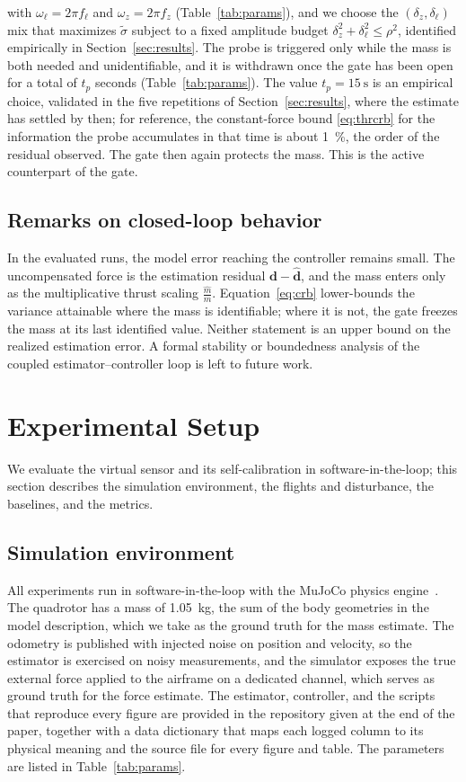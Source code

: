 \documentclass{ieeeaccess}
\newcommand{\vect}[1]{\bm{#1}}
\begin{document}
with $\omega_\ell=2\pi f_\ell$ and $\omega_z=2\pi f_z$ (Table~\ref{tab:params}),
and we choose the $(\delta_z,\delta_\ell)$ mix that maximizes $\tilde\sigma$ subject to a
fixed amplitude budget $\delta_z^2+\delta_\ell^2\le\rho^2$, identified empirically in
Section~\ref{sec:results}. The
probe is triggered only while the mass is both needed and unidentifiable, and it
is withdrawn once the gate has been open for a total of $t_p$ seconds
(Table~\ref{tab:params}). The value $t_p=\SI{15}{\second}$ is an empirical
choice, validated in the five repetitions of Section~\ref{sec:results}, where the
estimate has settled by then; for reference, the constant-force bound
\eqref{eq:thrcrb} for the information the probe accumulates in that time is about
\SI{1}{\percent}, the order of the residual observed. The gate then again
protects the mass. This is the active
counterpart of the gate.

\subsection{Remarks on closed-loop behavior}
In the evaluated runs, the model error reaching the controller remains small.
The uncompensated force is the estimation residual
$\vect{d}-\hat{\vect{d}}$, and the mass enters only as the multiplicative thrust
scaling $\tfrac{\hat m}{m}$. Equation~\eqref{eq:crb} lower-bounds the variance
attainable where the mass is identifiable; where it is not, the gate freezes the
mass at its last identified value. Neither statement is an upper bound on the
realized estimation error. A formal stability or boundedness analysis of the
coupled estimator--controller loop is left to future work.

\section{Experimental Setup}\label{sec:setup}

We evaluate the virtual sensor and its self-calibration in software-in-the-loop;
this section describes the simulation environment, the flights and disturbance, the
baselines, and the metrics.

\subsection{Simulation environment}
All experiments run in software-in-the-loop with the MuJoCo physics
engine~\cite{todorov2012mujoco}. The quadrotor has a mass of \SI{1.05}{\kilogram},
the sum of the body geometries in the model description, which we take as the
ground truth for the mass estimate. The odometry is published with injected
noise on position and velocity, so the estimator is exercised on noisy
measurements, and
the simulator exposes the true external force applied to the airframe on a
dedicated channel, which serves as ground truth for the force estimate. The
estimator, controller, and the scripts that reproduce every figure are provided
in the repository given at the end of the paper, together with a data dictionary that maps each logged
column to its physical meaning and the source file for every figure and table. The
parameters are listed in Table~\ref{tab:params}.
\end{document}
